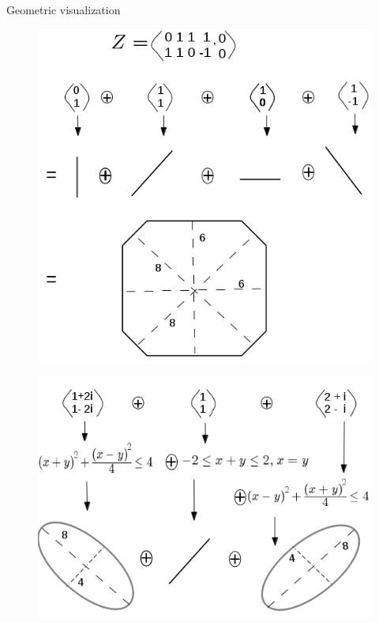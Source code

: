 \begin{frame}{Geometric visualization}
\begin{minipage}{0.45\textwidth}
\begin{figure}
\caption*{}
\hspace{-2em}\includegraphics[scale=0.35]{fig/real-zonotope.png}
\end{figure}
\end{minipage}
\vrule
\hspace{1em}
\begin{minipage}{0.45\textwidth}
\begin{figure}
\caption*{}
\includegraphics[scale=0.4]{fig/complex-zonotope.png}\\

\end{figure}
\end{minipage}
\end{frame}

